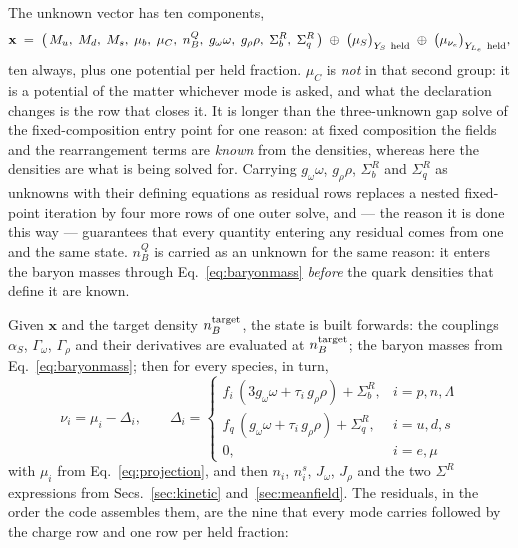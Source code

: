 \documentclass[aps,prc,onecolumn,superscriptaddress,nofootinbib,10pt]{revtex4-2}
\newcommand{\nB}{n_B}
\newcommand{\muC}{\mu_C}
\newcommand{\muS}{\mu_S}
\newcommand{\SR}{\Sigma^{R}}
\begin{document}
The unknown vector has ten components,
%
\begin{equation}
\mathbf{x} \;=\; \big(\,
  M_u,\; M_d,\; M_s,\;
  \mu_b,\; \muC,\;
  \nB^{Q},\;
  g_\omega\omega,\; g_\rho\rho,\;
  \SR_b,\; \SR_q \,\big)
  \;\oplus\; \big(\muS\big)_{Y_S\ \rm held}
  \;\oplus\; \big(\mu_{\nu_e}\big)_{Y_{L_e}\ \rm held} ,
\label{eq:unknowns}
\end{equation}
%
ten always, plus one potential per held fraction. $\muC$ is \emph{not} in that
second group: it is a potential of the matter whichever mode is asked, and
what the declaration changes is the row that closes it. It is longer than the three-unknown gap solve of the fixed-composition
entry point for one reason: at fixed composition the fields and the
rearrangement terms are \emph{known} from the densities, whereas here the
densities are what is being solved for. Carrying $g_\omega\omega$,
$g_\rho\rho$, $\SR_b$ and $\SR_q$ as unknowns with their defining equations as
residual rows replaces a nested fixed-point iteration by four more rows of one
outer solve, and --- the reason it is done this way --- guarantees that every
quantity entering any residual comes from one and the same state.
$\nB^Q$ is carried as an unknown for the same reason: it enters the baryon
masses through Eq.~\eqref{eq:baryonmass} \emph{before} the quark densities
that define it are known.

Given $\mathbf{x}$ and the target density $\nB^{\rm target}$, the state is
built forwards: the couplings $\alpha_S$, $\Gamma_\omega$, $\Gamma_\rho$ and
their derivatives are evaluated at $\nB^{\rm target}$; the baryon masses from
Eq.~\eqref{eq:baryonmass}; then for every species, in turn,
%
\begin{equation}
\nu_i = \mu_i - \Delta_i , \qquad
\Delta_i =
\begin{cases}
 f_i\,(3 g_\omega\omega + \tau_i\, g_\rho\rho) + \SR_b , & i = p,n,\Lambda \\
 f_q\,(  g_\omega\omega + \tau_i\, g_\rho\rho) + \SR_q , & i = u,d,s \\
 0 , & i = e,\mu
\end{cases}
\label{eq:forward}
\end{equation}
%
with $\mu_i$ from Eq.~\eqref{eq:projection}, and then $n_i$, $n^s_i$,
$J_\omega$, $J_\rho$ and the two $\SR$ expressions from
Secs.~\ref{sec:kinetic} and~\ref{sec:meanfield}. The residuals, in the order
the code assembles them, are the nine that every mode carries followed by the
charge row and one row per held fraction:
\end{document}
